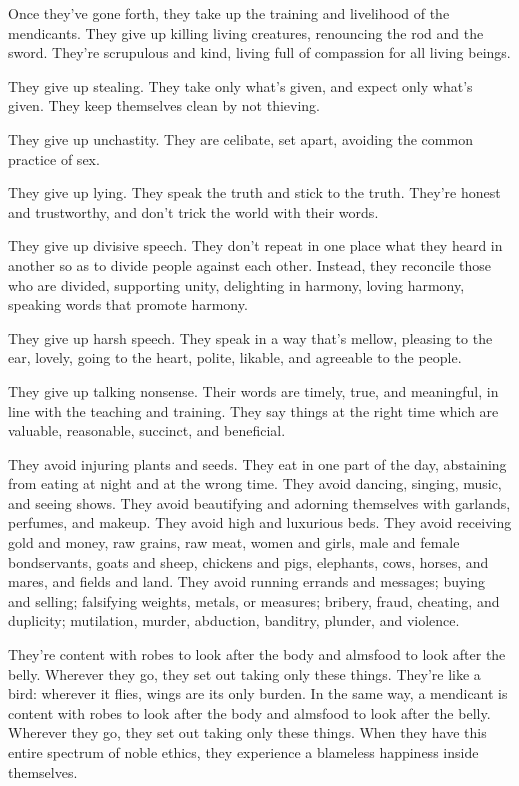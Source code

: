 \documentclass[12pt,openany]{book}%
\begin{document}
Once they’ve gone forth, they take up the training and livelihood of the mendicants. They give up killing living creatures, renouncing the rod and the sword. They’re scrupulous and kind, living full of compassion for all living beings. 

They give up stealing. They take only what’s given, and expect only what’s given. They keep themselves clean by not thieving. 

They give up unchastity. They are celibate, set apart, avoiding the common practice of sex. 

They give up lying. They speak the truth and stick to the truth. They’re honest and trustworthy, and don’t trick the world with their words. 

They give up divisive speech. They don’t repeat in one place what they heard in another so as to divide people against each other. Instead, they reconcile those who are divided, supporting unity, delighting in harmony, loving harmony, speaking words that promote harmony. 

They give up harsh speech. They speak in a way that’s mellow, pleasing to the ear, lovely, going to the heart, polite, likable, and agreeable to the people. 

They give up talking nonsense. Their words are timely, true, and meaningful, in line with the teaching and training. They say things at the right time which are valuable, reasonable, succinct, and beneficial. 

They avoid injuring plants and seeds. They eat in one part of the day, abstaining from eating at night and at the wrong time. They avoid dancing, singing, music, and seeing shows. They avoid beautifying and adorning themselves with garlands, perfumes, and makeup. They avoid high and luxurious beds. They avoid receiving gold and money, raw grains, raw meat, women and girls, male and female bondservants, goats and sheep, chickens and pigs, elephants, cows, horses, and mares, and fields and land. They avoid running errands and messages; buying and selling; falsifying weights, metals, or measures; bribery, fraud, cheating, and duplicity; mutilation, murder, abduction, banditry, plunder, and violence. 

They’re content with robes to look after the body and almsfood to look after the belly. Wherever they go, they set out taking only these things. They’re like a bird: wherever it flies, wings are its only burden. In the same way, a mendicant is content with robes to look after the body and almsfood to look after the belly. Wherever they go, they set out taking only these things. When they have this entire spectrum of noble ethics, they experience a blameless happiness inside themselves. 
\end{document}
